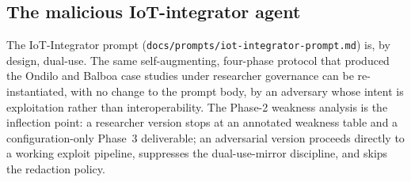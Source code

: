 \documentclass[11pt,a4paper]{article}
\begin{document}
\subsection{The malicious IoT-integrator agent}
\label{sec:disc-malicious-integrator}
The IoT-Integrator prompt
(\texttt{docs/prompts/iot-integrator-prompt.md}) is, by design,
dual-use. The same self-augmenting, four-phase protocol that produced
the Ondilo and Balboa case studies under researcher governance can be
re-instantiated, with no change to the prompt body, by an adversary
whose intent is exploitation rather than interoperability. The Phase-2
weakness analysis is the inflection point: a researcher version stops
at an annotated weakness table and a configuration-only Phase~3
deliverable; an adversarial version proceeds directly to a working
exploit pipeline, suppresses the dual-use-mirror discipline, and skips
the redaction policy.
\end{document}
